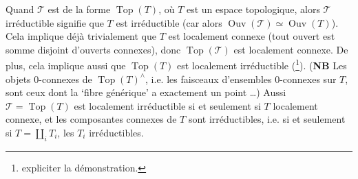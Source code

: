 Quand $\mathcal{T}$ est de la forme $\operatorname{Top}(T)$, où $T$ est un espace topologique, alors $\mathcal{T}$ irréductible signifie que $T$ est irréductible (car alors $\operatorname{Ouv}(\mathcal{T}) \simeq \operatorname{Ouv}(T)$). Cela implique déjà trivialement que $T$ est localement connexe (tout ouvert est somme disjoint d'ouverts connexes), donc $\operatorname{Top}(\mathcal{T})$ est localement connexe. De plus, cela implique aussi que $\operatorname{Top}(T)$ est localement irréductible (\footnote[7]{expliciter la démonstration.}). (\textbf{NB} Les objets 0-connexes %
de $\operatorname{Top}(T)^\wedge$, i.e. les faisceaux d'ensembles 0-connexes sur $T$, sont ceux dont la `fibre générique' a exactement un point \dots) Aussi $\mathcal{T} = \operatorname{Top}(T)$ est localement irréductible si et seulement si $T$ localement connexe, et les composantes connexes de $T$ sont irréductibles, i.e. si et seulement si $T = \coprod_i T_i$, les $T_i$ irréductibles.

